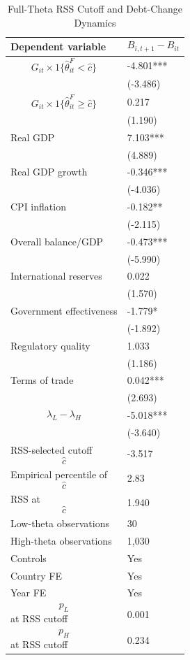 \begin{table}[H]\centering
\begin{threeparttable}
\caption{Full-Theta RSS Cutoff and Debt-Change Dynamics}
\label{tab:deltaB_rss_cutoff_fulltheta}
\scriptsize
\begin{tabularx}{\textwidth}{lY}
\toprule
Dependent variable & $$B_{i,t+1}-B_{it}$$ \\
\midrule
$$G_{it}\times 1\{\widehat{\theta}^{F}_{it}<\widehat{c}\}$$ & -4.801*** \\
 & (-3.486) \\
$$G_{it}\times 1\{\widehat{\theta}^{F}_{it}\geq\widehat{c}\}$$ & 0.217 \\
 & (1.190) \\
Real GDP & 7.103*** \\
 & (4.889) \\
Real GDP growth & -0.346*** \\
 & (-4.036) \\
CPI inflation & -0.182** \\
 & (-2.115) \\
Overall balance/GDP & -0.473*** \\
 & (-5.990) \\
International reserves & 0.022 \\
 & (1.570) \\
Government effectiveness & -1.779* \\
 & (-1.892) \\
Regulatory quality & 1.033 \\
 & (1.186) \\
Terms of trade & 0.042*** \\
 & (2.693) \\
$$\lambda_L-\lambda_H$$ & -5.018*** \\
 & (-3.640) \\
\midrule
RSS-selected cutoff $$\widehat{c}$$ & -3.517 \\
Empirical percentile of $$\widehat{c}$$ & 2.83 \\
RSS at $$\widehat{c}$$ & 1.940 \\
Low-theta observations & 30 \\
High-theta observations & 1,030 \\
Controls & Yes \\
Country FE & Yes \\
Year FE & Yes \\
$$p_L$$ at RSS cutoff & 0.001 \\
$$p_H$$ at RSS cutoff & 0.234 \\

\end{tabularx}
\end{threeparttable}
\end{table}
